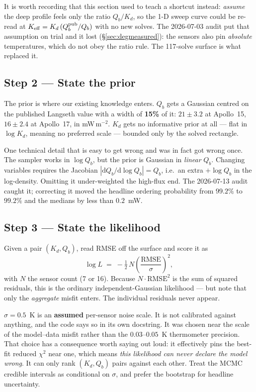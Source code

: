 \documentclass[11pt]{report}
\begin{document}
\noindent It is worth recording that this section used to teach a shortcut
instead: \emph{assume} the deep profile feels only the ratio $Q_b/K_d$, so
the 1-D sweep curve could be re-read at
$K_{\rm eff} = K_d\,(Q_b^{\rm pub}/Q_b)$ with no new solves. The 2026-07-03
audit put that assumption on trial and it lost (\S\ref{sec:degmeasured}): the
sensors also pin \emph{absolute} temperatures, which do not obey the ratio
rule. The 117-solve surface is what replaced it.

\subsection*{Step 2 --- State the prior}
The prior is where our existing knowledge enters. $Q_b$ gets a Gaussian
centred on the published Langseth value with a width of \textbf{15\%} of it:
$21\pm3.2$ at Apollo~15, $16\pm2.4$ at Apollo~17, in mW\,m$^{-2}$. $K_d$ gets
no informative prior at all --- flat in $\log K_d$, meaning no preferred
scale --- bounded only by the solved rectangle.

One technical detail that is easy to get wrong and was in fact got wrong
once. The sampler works in $\log Q_b$, but the prior is Gaussian in
\emph{linear} $Q_b$. Changing variables requires the Jacobian
$|\mathrm{d}Q_b/\mathrm{d}\log Q_b| = Q_b$, i.e.\ an extra $+\log Q_b$ in the
log-density. Omitting it under-weighted the high-flux end. The 2026-07-13
audit caught it; correcting it moved the headline ordering probability from
$99.2\%$ to $99.2\%$ and the medians by less than $0.2$~mW.

\subsection*{Step 3 --- State the likelihood}
Given a pair $(K_d,Q_b)$, read RMSE off the surface and score it as
\[
  \log L \;=\; -\tfrac12\,N\left(\frac{\mathrm{RMSE}}{\sigma}\right)^{2},
\]
with $N$ the sensor count (7 or 16). Because $N\cdot\mathrm{RMSE}^2$ is the
sum of squared residuals, this is the ordinary independent-Gaussian
likelihood --- but note that only the \emph{aggregate} misfit enters. The
individual residuals never appear.

\begin{warn}
$\sigma = 0.5$~K is an \textbf{assumed} per-sensor noise scale. It is not
calibrated against anything, and the code says so in its own docstring. It
was chosen near the scale of the model--data misfit rather than the
$0.03$--$0.05$~K thermometer precision. That choice has a consequence worth
saying out loud: it effectively pins the best-fit reduced $\chi^2$ near one,
which means \emph{this likelihood can never declare the model wrong}. It can
only rank $(K_d,Q_b)$ pairs against each other. Treat the MCMC credible
intervals as conditional on $\sigma$, and prefer the bootstrap for headline
uncertainty.
\end{warn}
\end{document}
